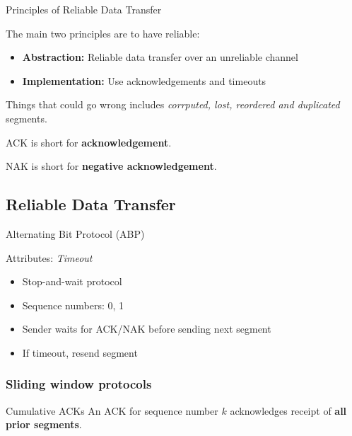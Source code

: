 \begin{definition}
    {Principles of Reliable Data Transfer}

    The main two principles are to have reliable:
    \begin{itemize}
        \item \textbf{Abstraction:} Reliable data transfer over an unreliable channel
        \item \textbf{Implementation:} Use acknowledgements and timeouts
    \end{itemize}

    Things that could go wrong includes \textit{corrputed, lost, reordered and duplicated} segments.
\end{definition}

ACK is short for \textbf{acknowledgement}.

NAK is short for \textbf{negative acknowledgement}.

\subsection{Reliable Data Transfer}

\begin{theorem}
    {Alternating Bit Protocol (ABP)}

    Attributes: \textit{Timeout}

    \begin{itemize}
        \item Stop-and-wait protocol
        \item Sequence numbers: 0, 1
        \item Sender waits for ACK/NAK before sending next segment
        \item If timeout, resend segment
    \end{itemize}
\end{theorem}


\subsubsection{Sliding window protocols}

\begin{knBox}
    {Cumulative ACKs}
    An ACK for sequence number $k$ acknowledges receipt of \textbf{all prior segments}.
\end{knBox}

